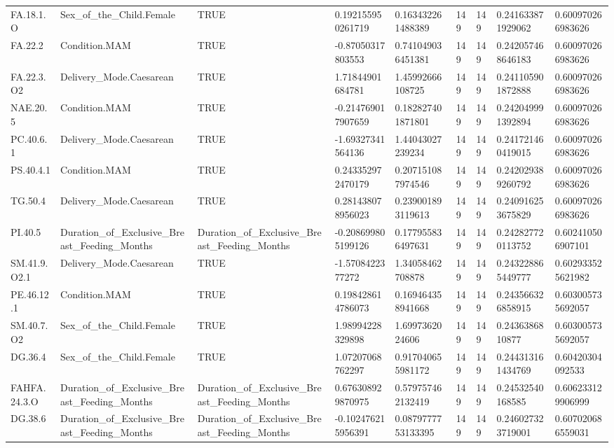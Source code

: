 \begin{longtable}{lllllllll}
FA.18.1.O & Sex\_of\_the\_Child.Female & TRUE & 0.192155950261719 & 0.163432261488389 & 149 & 149 & 0.241633871929062 & 0.600970266983626 \\
FA.22.2 & Condition.MAM & TRUE & -0.87050317803553 & 0.741049036451381 & 149 & 149 & 0.242057468646183 & 0.600970266983626 \\
FA.22.3.O2 & Delivery\_Mode.Caesarean & TRUE & 1.71844901684781 & 1.45992666108725 & 149 & 149 & 0.241105901872888 & 0.600970266983626 \\
NAE.20.5 & Condition.MAM & TRUE & -0.214769017907659 & 0.182827401871801 & 149 & 149 & 0.242049991392894 & 0.600970266983626 \\
PC.40.6.1 & Delivery\_Mode.Caesarean & TRUE & -1.69327341564136 & 1.44043027239234 & 149 & 149 & 0.241721460419015 & 0.600970266983626 \\
PS.40.4.1 & Condition.MAM & TRUE & 0.243352972470179 & 0.207151087974546 & 149 & 149 & 0.242029389260792 & 0.600970266983626 \\
TG.50.4 & Delivery\_Mode.Caesarean & TRUE & 0.281438078956023 & 0.239001893119613 & 149 & 149 & 0.240916253675829 & 0.600970266983626 \\
PI.40.5 & Duration\_of\_Exclusive\_Breast\_Feeding\_Months & Duration\_of\_Exclusive\_Breast\_Feeding\_Months & -0.208699805199126 & 0.177955836497631 & 149 & 149 & 0.242827720113752 & 0.602410506907101 \\
SM.41.9.O2.1 & Delivery\_Mode.Caesarean & TRUE & -1.5708422377272 & 1.34058462708878 & 149 & 149 & 0.243228865449777 & 0.602933525621982 \\
PE.46.12.1 & Condition.MAM & TRUE & 0.198428614786073 & 0.169464358941668 & 149 & 149 & 0.243566326858915 & 0.603005735692057 \\
SM.40.7.O2 & Sex\_of\_the\_Child.Female & TRUE & 1.98994228329898 & 1.6997362024606 & 149 & 149 & 0.2436386810877 & 0.603005735692057 \\
DG.36.4 & Sex\_of\_the\_Child.Female & TRUE & 1.07207068762297 & 0.917040655981172 & 149 & 149 & 0.244313161434769 & 0.60420304092533 \\
FAHFA.24.3.O & Duration\_of\_Exclusive\_Breast\_Feeding\_Months & Duration\_of\_Exclusive\_Breast\_Feeding\_Months & 0.676308929870975 & 0.579757462132419 & 149 & 149 & 0.24532540168585 & 0.606233129906999 \\
DG.38.6 & Duration\_of\_Exclusive\_Breast\_Feeding\_Months & Duration\_of\_Exclusive\_Breast\_Feeding\_Months & -0.102476215956391 & 0.0879777753133395 & 149 & 149 & 0.246027323719001 & 0.607020686559031 \\

\end{longtable}
